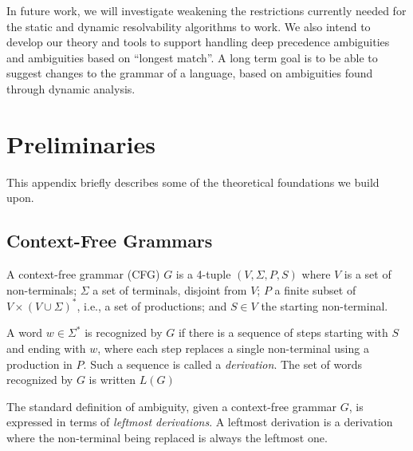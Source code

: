 \documentclass[runningheads]{llncs}
\newcommand{\NT}{V} %
\newcommand{\T}{\Sigma} %
\begin{document}
In future work, we will investigate weakening the restrictions
currently needed for the static and dynamic resolvability
algorithms to work. We also intend to develop our theory and tools
to support handling deep precedence ambiguities and ambiguities
based on ``longest match''. A long term goal is to be able to
suggest changes to the grammar of a language, based on ambiguities
found through dynamic analysis.





\appendix

\section{Preliminaries}
\label{app:prel}

This appendix briefly describes some of the theoretical
foundations we build upon.

\subsection{Context-Free Grammars} \label{sec:preliminaries-cfgs}

A context-free grammar (CFG) $G$ is a 4-tuple $(\NT, \T, P, S)$ where $\NT$ is a set of non-terminals; $\T$ a set of terminals, disjoint from $\NT$; $P$ a finite subset of $\NT \times (\NT \cup \T)^{*}$, i.e., a set of productions; and $S \in \NT$ the starting non-terminal.

%
A word $w \in \T^{*}$ is recognized by $G$ if there is a sequence of steps starting with $S$ and ending with $w$, where each step replaces a single non-terminal using a production in $P$. Such a sequence is called a \emph{derivation}. The set of words recognized by $G$ is written $L(G)$


The standard definition of ambiguity, given a context-free grammar $G$, is expressed in terms of \emph{leftmost derivations}. A leftmost derivation is a derivation where the non-terminal being replaced is always the leftmost one.
\end{document}
